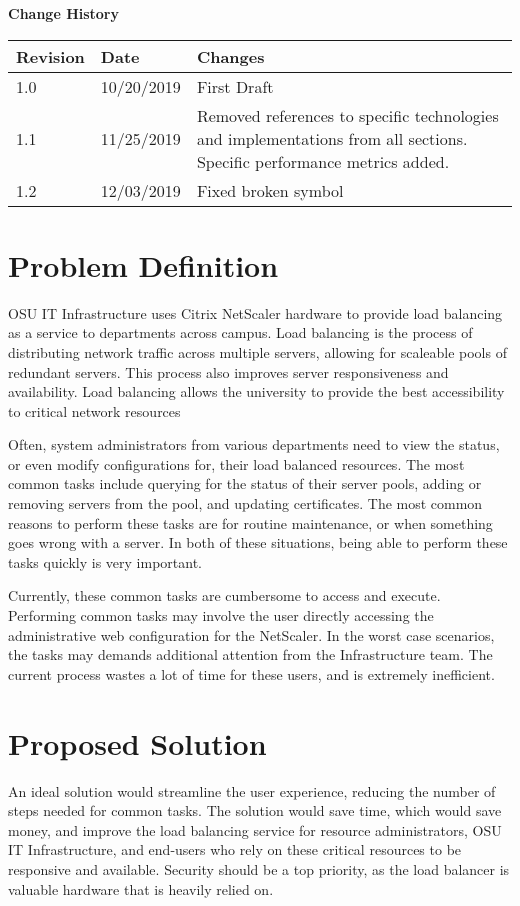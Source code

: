 \documentclass[onecolumn, draftclsnofoot,10pt, compsoc]{IEEEtran}
\begin{document}
\textbf{Change History}\par

\begin{tabular}{ p{1in} p{1in} p{4in} }
 \textbf{Revision} & \textbf{Date} & \textbf{Changes} \\
 \hline
 1.0 & 10/20/2019 
 & First Draft \\
 \hline
 1.1 & 11/25/2019 
 & Removed references to specific technologies and implementations from all sections. Specific performance metrics added.\\
 \hline
  1.2 & 12/03/2019 
 & Fixed broken symbol \\
 \hline
\end{tabular}

\clearpage

\section{Problem Definition}
OSU IT Infrastructure uses Citrix NetScaler hardware to provide load balancing as a service to departments across campus.
Load balancing is the process of distributing network traffic across multiple servers, allowing for scaleable pools of redundant servers.
This process also improves server responsiveness and availability.
Load balancing allows the university to provide the best accessibility to critical network resources

Often, system administrators from various departments need to view the status, or even modify configurations for, their load balanced resources.
The most common tasks include querying for the status of their server pools, adding or removing servers from the pool, and updating certificates.
The most common reasons to perform these tasks are for routine maintenance, or when something goes wrong with a server.
In both of these situations, being able to perform these tasks quickly is very important.

Currently, these common tasks are cumbersome to access and execute.
Performing common tasks may involve the user directly accessing the administrative web configuration for the NetScaler.
In the worst case scenarios, the tasks may demands additional attention from the Infrastructure team.
The current process wastes a lot of time for these users, and is extremely inefficient.

\section{Proposed Solution}
An ideal solution would streamline the user experience, reducing the number of steps needed for common tasks.
The solution would save time, which would save money, and improve the load balancing service for resource administrators, OSU IT Infrastructure, and end-users who rely on these critical resources to be responsive and available.
Security should be a top priority, as the load balancer is valuable hardware that is heavily relied on.
\end{document}
